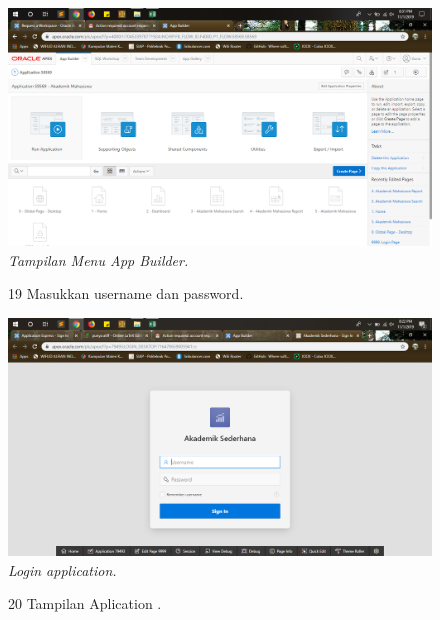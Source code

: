\begin{enumerate}
\begin{figure}
    \begin{center}
\includegraphics[scale=0.2]{figures/g16.png}
    \caption{\textit{Tampilan Menu App Builder.}}
        \end{center}
\label{gambar}
\end{figure}


\begin{figure}
\item[19]Masukkan username dan password.

    \begin{center}
\includegraphics[scale=0.2]{figures/g17.png}
    \caption{\textit{Login application.}}
        \end{center}
\label{gambar}
\end{figure}

\begin{figure}
\item[20]Tampilan Aplication .


\end{figure}
\end{enumerate}
